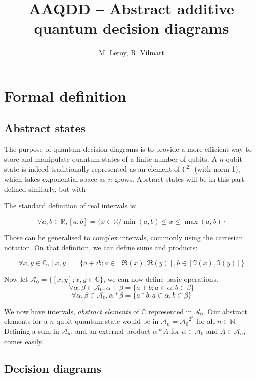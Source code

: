 \documentclass{article}
\title{AAQDD -- Abstract additive quantum decision diagrams}
\author{M. Leroy, R. Vilmart}
\begin{document}
\maketitle

\section{Formal definition}

\subsection{Abstract states}

The purpose of quantum decision diagrams is to provide a more efficient way to store and manipulate quantum states of a finite number of qubits. A $n$-qubit state is indeed traditionally represented as an element of $\mathbb{C}^{2^n}$ (with norm 1), which takes exponential space as $n$ grows. Abstract states will be in this part defined similarly, but with


The standard definition of real intervals is:

$$\forall a, b \in \mathbb{R}, [a, b]
= \{x \in \mathbb{R} / \min(a, b) \le x \le \max(a, b)\}$$

Those can be generalised to complex intervals, commonly using the cartesian notation. On that definiton, we can define sums and products:

$$\forall x, y \in \mathbb{C}, [x, y]
= \{a + ib ; a \in [\Re(x), \Re(y)], b \in [\Im(x), \Im(y)]\}$$

Now let $\mathcal{A}_0 = \{[x, y] ; x, y \in \mathbb{C}\}$, we can now define basic operations.
$$\forall \alpha, \beta \in \mathcal{A}_0, \alpha + \beta = \{a + b ; a \in \alpha, b \in \beta\}$$
$$\forall \alpha, \beta \in \mathcal{A}_0, \alpha * \beta = \{a * b ; a \in \alpha, b \in \beta\}$$

We now have intervals, \textit{abstract elements} of $\mathbb{C}$ represented in $\mathcal{A}_0$. Our abstract elements for a $n$-qubit quantum state would be in $\mathcal{A}_n = {\mathcal{A}_0}^{2^n}$ for all $n \in \mathbb{N}$. Defining a sum in $\mathcal{A}_n$, and an external product $\alpha * A$ for
$\alpha \in \mathcal{A}_0$ and $A \in \mathcal{A}_n$, comes easily.

\subsection{Decision diagrams}
\end{document}
